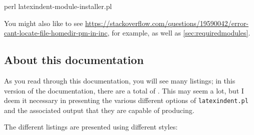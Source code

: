 \documentclass[10pt]{article}
\begin{document}
 \begin{commandshell}
perl latexindent-module-installer.pl
\end{commandshell}

 You might also like to see
 \href{https://stackoverflow.com/questions/19590042/error-cant-locate-file-homedir-pm-in-inc}{https://stackoverflow.com/questions/19590042/error-cant-locate-file-homedir-pm-in-inc},
 for example, as well as \vref{sec:requiredmodules}.

\subsection{About this documentation}
 As you read through this documentation, you will see many listings; in this version of
 the documentation, there are a total of \totallstlistings. This may seem a lot, but I
 deem it necessary in presenting the various different options of \texttt{latexindent.pl}
 and the associated output that they are capable of producing.

 The different listings are presented using different styles:
\end{document}

